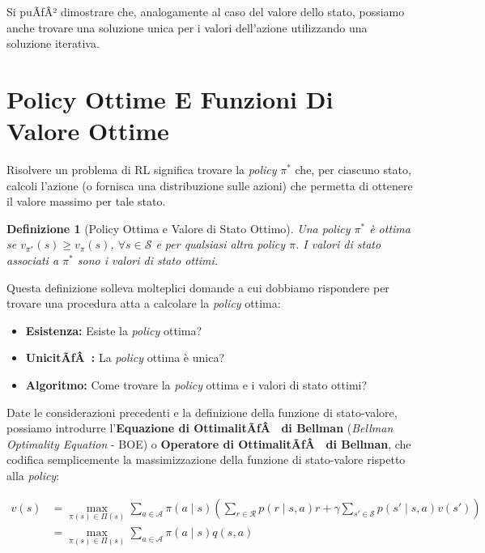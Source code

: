 ﻿\documentclass[11pt, a4paper]{report}
\newtheorem{definition}{Definizione}
\begin{document}
Si puÃƒÂ² dimostrare che, analogamente al caso del valore dello stato, possiamo anche trovare una soluzione unica per i valori dell'azione utilizzando una soluzione iterativa.

\section{Policy Ottime E Funzioni Di Valore Ottime}

Risolvere un problema di RL significa trovare la \emph{policy} $\pi^*$ che, per ciascuno stato, calcoli l'azione (o fornisca una distribuzione sulle azioni) che permetta di ottenere il valore massimo per tale stato.

\begin{definition}[Policy Ottima e Valore di Stato Ottimo]
Una \emph{policy} $\pi^*$ è ottima se $v_{\pi^*}(s) \ge v_\pi(s)$, $\forall s \in \mathcal{S}$ e per qualsiasi altra \emph{policy} $\pi$. I valori di stato associati a $\pi^*$ sono i valori di stato ottimi.
\end{definition}

Questa definizione solleva molteplici domande a cui dobbiamo rispondere per trovare una procedura atta a calcolare la \emph{policy} ottima:
\begin{itemize}[noitemsep]
    \item \textbf{Esistenza:} Esiste la \emph{policy} ottima?
    \item \textbf{UnicitÃƒÂ :} La \emph{policy} ottima è unica?
    \item \textbf{Algoritmo:} Come trovare la \emph{policy} ottima e i valori di stato ottimi?
\end{itemize}

Date le considerazioni precedenti e la definizione della funzione di stato-valore, possiamo introdurre l'\textbf{Equazione di OttimalitÃƒÂ  di Bellman} (\emph{Bellman Optimality Equation} - BOE) o \textbf{Operatore di OttimalitÃƒÂ  di Bellman}, che codifica semplicemente la massimizzazione della funzione di stato-valore rispetto alla \emph{policy}:

\begin{equation}
\begin{aligned}
v(s) &= \max_{\pi(s) \in \Pi(s)} \sum_{a \in \mathcal{A}} \pi(a \mid s) \left( \sum_{r \in \mathcal{R}} p(r \mid s, a)r + \gamma \sum_{s' \in \mathcal{S}} p(s' \mid s, a)v(s') \right) \\
&= \max_{\pi(s) \in \Pi(s)} \sum_{a \in \mathcal{A}} \pi(a \mid s) q(s, a)
\end{aligned}
\end{equation}
\end{document}
